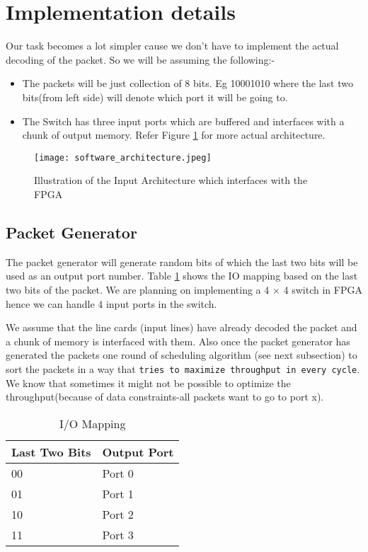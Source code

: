 \documentclass[twoside,12pt,fleqn]{book} %
\begin{document}
\section{Implementation details }
Our task becomes a lot simpler  cause we don't have to implement the actual decoding of the packet. So we will be assuming the following:-
\begin{itemize}
    \item The packets will be just collection of 8 bits. Eg 10001010 where the last two bits(from left side) will denote which port it will be going to.
    \item The Switch has three input ports which are buffered and interfaces with a chunk of output memory. Refer Figure \ref{fig:software_implementation} for more actual architecture.
\end{itemize}
\begin{figure}[ht]
    \centering
    \texttt{[image: software\_architecture.jpeg]}
    \caption{Illustration of the Input Architecture which interfaces with the FPGA}
    \label{fig:software_implementation}
\end{figure}

\subsection{Packet Generator}
The packet generator will generate random bits of which the last two bits will be used as an output port number. Table \ref{table:io_mapping} shows the IO mapping based on the last two bits of the packet. We are planning on implementing a 4 $\times$ 4 switch in FPGA hence we can handle 4 input ports in the switch.
\par\vspace{\baselineskip}
We assume that the line cards (input lines) have already decoded the packet and a chunk of memory is interfaced with them. Also once the packet generator has generated the packets one round of scheduling algorithm (see next subsection) to sort the packets in a way that \texttt{tries to maximize throughput in every cycle}. We know that sometimes it might not be possible to optimize the throughput(because of data constraints-all packets want to go to port x). \\
\begin{table}[h!]
\begin{center}
    \begin{tabular}{| l | l |}
    \hline
    Last Two Bits & Output Port \\ \hline
    00 & Port 0 \\ \hline
    01 & Port 1 \\ \hline
    10 & Port 2 \\ \hline
    11 & Port 3\\ \hline
    \end{tabular}
    \caption{I/O Mapping}
	\label{table:io_mapping}
\end{center}
\end{table}
\end{document}
